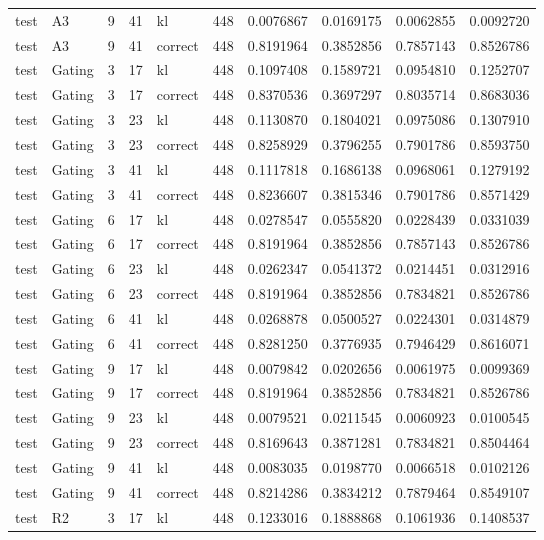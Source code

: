 \begin{tabular}{llrrlrrrrr}
test & A3 & 9 & 41 & kl & 448 & 0.0076867 & 0.0169175 & 0.0062855 & 0.0092720 \\
test & A3 & 9 & 41 & correct & 448 & 0.8191964 & 0.3852856 & 0.7857143 & 0.8526786 \\
test & Gating & 3 & 17 & kl & 448 & 0.1097408 & 0.1589721 & 0.0954810 & 0.1252707 \\
test & Gating & 3 & 17 & correct & 448 & 0.8370536 & 0.3697297 & 0.8035714 & 0.8683036 \\
test & Gating & 3 & 23 & kl & 448 & 0.1130870 & 0.1804021 & 0.0975086 & 0.1307910 \\
test & Gating & 3 & 23 & correct & 448 & 0.8258929 & 0.3796255 & 0.7901786 & 0.8593750 \\
test & Gating & 3 & 41 & kl & 448 & 0.1117818 & 0.1686138 & 0.0968061 & 0.1279192 \\
test & Gating & 3 & 41 & correct & 448 & 0.8236607 & 0.3815346 & 0.7901786 & 0.8571429 \\
test & Gating & 6 & 17 & kl & 448 & 0.0278547 & 0.0555820 & 0.0228439 & 0.0331039 \\
test & Gating & 6 & 17 & correct & 448 & 0.8191964 & 0.3852856 & 0.7857143 & 0.8526786 \\
test & Gating & 6 & 23 & kl & 448 & 0.0262347 & 0.0541372 & 0.0214451 & 0.0312916 \\
test & Gating & 6 & 23 & correct & 448 & 0.8191964 & 0.3852856 & 0.7834821 & 0.8526786 \\
test & Gating & 6 & 41 & kl & 448 & 0.0268878 & 0.0500527 & 0.0224301 & 0.0314879 \\
test & Gating & 6 & 41 & correct & 448 & 0.8281250 & 0.3776935 & 0.7946429 & 0.8616071 \\
test & Gating & 9 & 17 & kl & 448 & 0.0079842 & 0.0202656 & 0.0061975 & 0.0099369 \\
test & Gating & 9 & 17 & correct & 448 & 0.8191964 & 0.3852856 & 0.7834821 & 0.8526786 \\
test & Gating & 9 & 23 & kl & 448 & 0.0079521 & 0.0211545 & 0.0060923 & 0.0100545 \\
test & Gating & 9 & 23 & correct & 448 & 0.8169643 & 0.3871281 & 0.7834821 & 0.8504464 \\
test & Gating & 9 & 41 & kl & 448 & 0.0083035 & 0.0198770 & 0.0066518 & 0.0102126 \\
test & Gating & 9 & 41 & correct & 448 & 0.8214286 & 0.3834212 & 0.7879464 & 0.8549107 \\
test & R2 & 3 & 17 & kl & 448 & 0.1233016 & 0.1888868 & 0.1061936 & 0.1408537 \\

\end{tabular}
